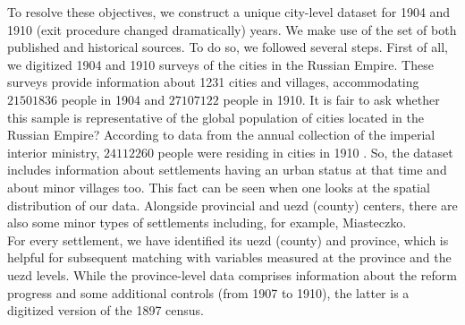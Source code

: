 \documentclass[a4paper, 12pt]{article}
\begin{document}
    
    
    
    \noindent To resolve these objectives, we construct a unique city-level dataset for 1904 and 1910 (exit procedure changed dramatically) years. We make use of the set of both published and historical sources.  To do so, we followed several steps. First of all, we digitized 1904 and 1910 surveys of the cities in the Russian Empire. These surveys provide information about 1231 cities and villages, accommodating  $21501836$ people in 1904 and $27107122$ people in 1910. It is fair to ask whether this sample is representative of the global population of cities located in the Russian Empire? According to data from the annual collection of the imperial interior ministry, $24112260$ people were residing in cities in 1910 \parencite{internal}. So, the dataset includes information about settlements having an urban status at that time and about minor villages too. This fact can be seen when one looks at the spatial distribution of our data. Alongside provincial and uezd (county) centers, there are also some minor types of settlements including, for example, Miasteczko.
    \\
    
    \noindent For every settlement, we have identified its uezd (county) and province, which is helpful for subsequent matching with variables measured at the province and the uezd levels. While the province-level data comprises information about the reform progress and some additional controls (from 1907 to 1910), the latter is a digitized version of the 1897 census.
    \\
    
\end{document}
